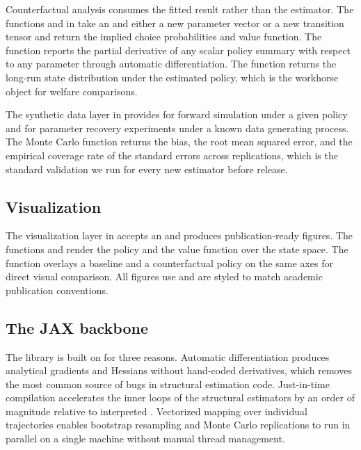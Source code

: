 Counterfactual analysis consumes the fitted result rather than the estimator. The functions  and  in  take an  and either a new parameter vector or a new transition tensor and return the implied choice probabilities and value function. The  function reports the partial derivative of any scalar policy summary with respect to any parameter through automatic differentiation. The  function returns the long-run state distribution under the estimated policy, which is the workhorse object for welfare comparisons.

The synthetic data layer in  provides  for forward simulation under a given policy and  for parameter recovery experiments under a known data generating process. The Monte Carlo function returns the bias, the root mean squared error, and the empirical coverage rate of the standard errors across replications, which is the standard validation we run for every new estimator before release.

\subsection{Visualization}

The visualization layer in  accepts an  and produces publication-ready figures. The functions  and  render the policy and the value function over the state space. The function  overlays a baseline and a counterfactual policy on the same axes for direct visual comparison. All figures use  and are styled to match academic publication conventions.

\subsection{The JAX backbone}

The library is built on  \citep{jax2018github} for three reasons. Automatic differentiation produces analytical gradients and Hessians without hand-coded derivatives, which removes the most common source of bugs in structural estimation code. Just-in-time compilation accelerates the inner loops of the structural estimators by an order of magnitude relative to interpreted . Vectorized mapping over individual trajectories enables bootstrap resampling and Monte Carlo replications to run in parallel on a single machine without manual thread management.

